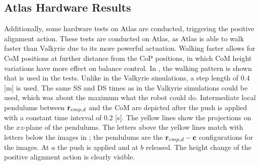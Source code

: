 \subsection{Atlas Hardware Results}
Additionally, some hardware tests on Atlas are conducted, triggering the positive alignment action. These tests are conducted on Atlas, as Atlas is able to walk faster than Valkyrie due to its more powerful actuation. Walking faster allows for \ac{CoM} positions at further distance from the \ac{CoP} positions, in which \ac{CoM} height variations have more effect on balance control. In , the walking pattern is shown that is used in the tests. Unlike in the Valkyrie simulations, a step length of $0.4$ [m] is used. The same \ac{SS} and \ac{DS} times as in the Valkyrie simulations could be used, which was about the maximum what the robot could do. Intermediate local pendulums between $\mathbf{r}_{cmp,d}$ and the \ac{CoM} are depicted after the push is applied with a constant time interval of $0.2$ [s]. The yellow lines show the projections on the $xz$-plane of the pendulums. The letters above the yellow lines match with letters below the images in ; the pendulums are the $\mathbf{r}_{cmp,d}-\mathbf{c}$ configurations for the images. At $a$ the push is applied and at $b$ released. The height change of the positive alignment action is clearly visible.
